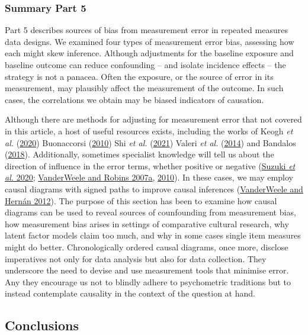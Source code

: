 \documentclass[
  singlecolumn]{article}
\begin{document}
\hypertarget{summary-part-5}{%
\subsubsection{Summary Part 5}\label{summary-part-5}}

Part 5 describes sources of bias from measurement error in repeated
measures data designs. We examined four types of measurement error bias,
assessing how each might skew inference. Although adjustments for the
baseline exposure and baseline outcome can reduce confounding -- and
isolate incidence effects -- the strategy is not a panacea. Often the
exposure, or the source of error in its measurement, may plausibly
affect the measurement of the outcome. In such cases, the correlations
we obtain may be biased indicators of causation.

Although there are methods for adjusting for measurement error that not
covered in this article, a host of useful resources exists, including
the works of Keogh \emph{et al.}
(\protect\hyperlink{ref-keogh2020}{2020}) Buonaccorsi
(\protect\hyperlink{ref-buonaccorsi2010}{2010}) Shi \emph{et al.}
(\protect\hyperlink{ref-shi2021}{2021}) Valeri \emph{et al.}
(\protect\hyperlink{ref-valeri2014}{2014}) and Bandalos
(\protect\hyperlink{ref-bandalos2018}{2018}). Additionally, sometimes
specialist knowledge will tell us about the direction of influence in
the error terms, whether positive or negative
(\protect\hyperlink{ref-suzuki2020}{Suzuki \emph{et al.} 2020};
\protect\hyperlink{ref-vanderweele2007a}{VanderWeele and Robins 2007a},
\protect\hyperlink{ref-vanderweele2010}{2010}). In these cases, we may
employ causal diagrams with signed paths to improve causal inferences
(\protect\hyperlink{ref-vanderweele2012}{VanderWeele and Hernán 2012}).
The purpose of this section has been to examine how causal diagrams can
be used to reveal sources of counfounding from measurement bias, how
measurement bias arises in settings of comparative cultural research,
why latent factor models claim too much, and why in some cases single
item measures might do better. Chronologically ordered causal diagrams,
once more, disclose imperatives not only for data analysis but also for
data collection. They underscore the need to devise and use measurement
tools that minimise error. Any they encourage us not to blindly adhere
to psychometric traditions but to instead contemplate causality in the
context of the question at hand.

\hypertarget{conclusions}{%
\subsection{Conclusions}\label{conclusions}}
\end{document}
